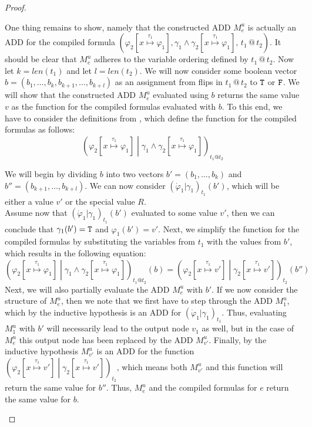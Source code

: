 \begin{proof}
\begin{itemize}
		One thing remains to show, namely that the constructed ADD $M^u_e$ is actually an ADD for the compiled formula $(\varphi_2[x\overset{\tau_1}{\mapsto} \varphi_1], 
		\gamma_1 \land \gamma_2[x\overset{\tau_1}{\mapsto} \varphi_1],\, 
		t_1 \,@\, t_2)$.
		It should be clear that $M^u_e$ adheres to the variable ordering defined by $t_1 \,@\, t_2$.
		Now let $k = len(t_1)$ and let $l = len(t_2)$.
		We will now consider some boolean vector $b = (b_1,\dots, b_k, b_{k + 1}, \dots, b_{k + l})$ as an assignment from flips in $t_1 \,@\, t_2$ to $\texttt{T}$ or $\texttt{F}$. 
		We will show that the constructed ADD $M^u_e$ evaluated using $b$ returns the same value $v$ as the function for the compiled formulas evaluated with $b$. 
		To this end, we have to consider the definitions from , which define the function for the compiled formulas as follows:
		$$\left(\varphi_2[x\overset{\tau_1}{\mapsto} \varphi_1] \middle|  
		\gamma_1 \land \gamma_2[x\overset{\tau_1}{\mapsto} \varphi_1]\right)_{t_1 @ t_2}$$
		
		We will begin by dividing $b$ into two vectors $b' = (b_1,\dots, b_k)$ and $b'' = (b_{k+1},\dots, b_{k+l})$.
		We can now consider $(\dot{\varphi}_1 | \gamma_1)_{t_1} (b')$, which will be either a value $v'$ or the special value $R$.
		\\
		
		Assume now that $(\dot{\varphi}_1 | \gamma_1)_{t_1} (b')$ evaluated to some value $v'$, then we can conclude that $\gamma_1  (b') = \texttt{T}$ and $\varphi_1  (b') = v'$.
		Next, we simplify the function for the compiled formulas by substituting the variables from $t_1$ with the values from $b'$, which results in the following equation:
		$$
			\left(\varphi_2[x\overset{\tau_1}{\mapsto} \varphi_1] \middle|  
			\gamma_1 \land \gamma_2[x\overset{\tau_1}{\mapsto} \varphi_1]\right)_{t_1 @ t_2} (b)
			=
			\left(\varphi_2[x\overset{\tau_1}{\mapsto} v'] \middle|  
			\gamma_2[x\overset{\tau_1}{\mapsto} v']\right)_{t_2} (b'')
		$$
		Next, we will also partially evaluate the ADD $M^u_e$ with $b'$.
		If we now consider the structure of $M^u_e$, then we note that we first have to step through the ADD $M^u_1$, which by the inductive hypothesis is an ADD for $(\dot{\varphi}_1 | \gamma_1)_{t_1}$.
		Thus, evaluating $M^u_1$ with $b'$ will necessarily lead to the output node $v_1$ as well, but in the case of $M^u_e$ this output node has been replaced by the ADD $M^u_{v'}$.
		Finally, by the inductive hypothesis $M^u_{v'}$ is an ADD for the function $\left(\varphi_2[x\overset{\tau_1}{\mapsto} v'] \middle|  
		\gamma_2[x\overset{\tau_1}{\mapsto} v']\right)_{t_2}$, which means both $M^u_{v'}$ and this function will return the same value for $b''$.
		Thus, $M^u_e$ and the compiled formulas for $e$ return the same value for $b$.
		\\
		

\end{itemize}
\end{proof}
